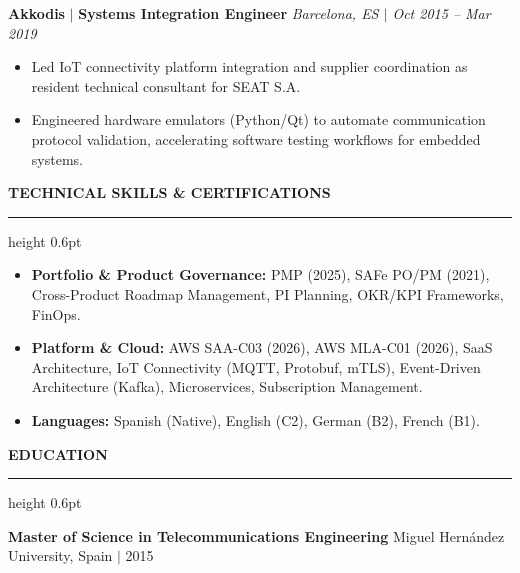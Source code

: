 \documentclass[a4paper,10pt]{article}
\newcommand{\Section}[1]{%
  \vspace{8pt}%
  {\large\bfseries\uppercase{#1}}%
  \vspace{2pt}\par\noindent\hrule height 0.6pt%
  \vspace{4pt}%
}
\begin{document}
\vspace{5pt}
\textbf{Akkodis} $|$ \textbf{Systems Integration Engineer} \hfill \textit{Barcelona, ES $|$ Oct 2015 -- Mar 2019}
\begin{itemize}
\item Led IoT connectivity platform integration and supplier coordination as resident technical consultant for SEAT S.A.
\item Engineered hardware emulators (Python/Qt) to automate communication protocol validation, accelerating software testing workflows for embedded systems.
\end{itemize}

\Section{Technical Skills \& Certifications}
\begin{itemize}
\item \textbf{Portfolio \& Product Governance:} PMP (2025), SAFe PO/PM (2021), Cross-Product Roadmap Management, PI Planning, OKR/KPI Frameworks, FinOps.
\item \textbf{Platform \& Cloud:} AWS SAA-C03 (2026), AWS MLA-C01 (2026), SaaS Architecture, IoT Connectivity (MQTT, Protobuf, mTLS), Event-Driven Architecture (Kafka), Microservices, Subscription Management.
\item \textbf{Languages:} Spanish (Native), English (C2), German (B2), French (B1).
\end{itemize}

\Section{Education}
\textbf{Master of Science in Telecommunications Engineering} \hfill Miguel Hern\'{a}ndez University, Spain $|$ 2015
\end{document}
